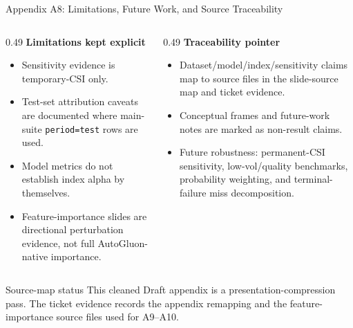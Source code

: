 \documentclass[10pt]{beamer}\usepackage[]{graphicx}\usepackage[table]{xcolor}
\begin{document}
\begin{frame}{Appendix A8: Limitations, Future Work, and Source Traceability}
\scriptsize
\begin{columns}[T,onlytextwidth]
\begin{column}{0.49\textwidth}
\textbf{Limitations kept explicit}
\begin{itemize}
  \item Sensitivity evidence is temporary-CSI only.
  \item Test-set attribution caveats are documented where main-suite \texttt{period=test} rows are used.
  \item Model metrics do not establish index alpha by themselves.
  \item Feature-importance slides are directional perturbation evidence, not full AutoGluon-native importance.
\end{itemize}
\end{column}
\begin{column}{0.49\textwidth}
\textbf{Traceability pointer}
\begin{itemize}
  \item Dataset/model/index/sensitivity claims map to source files in the slide-source map and ticket evidence.
  \item Conceptual frames and future-work notes are marked as non-result claims.
  \item Future robustness: permanent-CSI sensitivity, low-vol/quality benchmarks, probability weighting, and terminal-failure miss decomposition.
\end{itemize}
\end{column}
\end{columns}
\vspace{0.3em}
\begin{alertblock}{Source-map status}
\scriptsize
This cleaned Draft appendix is a presentation-compression pass. The ticket evidence records the appendix remapping and the feature-importance source files used for A9--A10.
\end{alertblock}
\end{frame}
\end{document}
